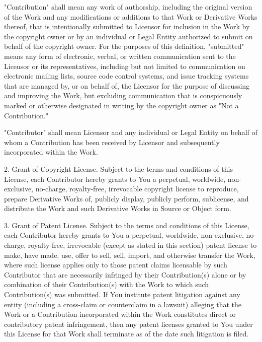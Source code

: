\begin{flushleft}
      "Contribution" shall mean any work of authorship, including
      the original version of the Work and any modifications or additions
      to that Work or Derivative Works thereof, that is intentionally
      submitted to Licensor for inclusion in the Work by the copyright owner
      or by an individual or Legal Entity authorized to submit on behalf of
      the copyright owner. For the purposes of this definition, "submitted"
      means any form of electronic, verbal, or written communication sent
      to the Licensor or its representatives, including but not limited to
      communication on electronic mailing lists, source code control systems,
      and issue tracking systems that are managed by, or on behalf of, the
      Licensor for the purpose of discussing and improving the Work, but
      excluding communication that is conspicuously marked or otherwise
      designated in writing by the copyright owner as "Not a Contribution."

      "Contributor" shall mean Licensor and any individual or Legal Entity
      on behalf of whom a Contribution has been received by Licensor and
      subsequently incorporated within the Work.

   2. Grant of Copyright License. Subject to the terms and conditions of
      this License, each Contributor hereby grants to You a perpetual,
      worldwide, non-exclusive, no-charge, royalty-free, irrevocable
      copyright license to reproduce, prepare Derivative Works of,
      publicly display, publicly perform, sublicense, and distribute the
      Work and such Derivative Works in Source or Object form.

   3. Grant of Patent License. Subject to the terms and conditions of
      this License, each Contributor hereby grants to You a perpetual,
      worldwide, non-exclusive, no-charge, royalty-free, irrevocable
      (except as stated in this section) patent license to make, have made,
      use, offer to sell, sell, import, and otherwise transfer the Work,
      where such license applies only to those patent claims licensable
      by such Contributor that are necessarily infringed by their
      Contribution(s) alone or by combination of their Contribution(s)
      with the Work to which such Contribution(s) was submitted. If You
      institute patent litigation against any entity (including a
      cross-claim or counterclaim in a lawsuit) alleging that the Work
      or a Contribution incorporated within the Work constitutes direct
      or contributory patent infringement, then any patent licenses
      granted to You under this License for that Work shall terminate
      as of the date such litigation is filed.


\end{flushleft}
